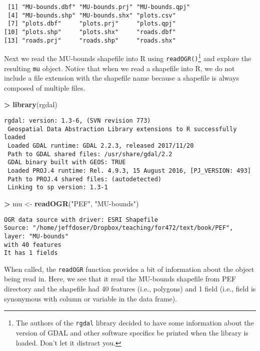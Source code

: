 \documentclass[]{krantz}
\makeatletter
\newenvironment{Shaded}{\begin{snugshade}}{\end{snugshade}}
\newcommand{\KeywordTok}[1]{\textcolor[rgb]{0.27,0.27,0.27}{\textbf{#1}}}
\newcommand{\StringTok}[1]{\textcolor[rgb]{0.5,0.5,0.5}{#1}}
\newcommand{\OperatorTok}[1]{\textcolor[rgb]{0.43,0.43,0.43}{\textbf{#1}}}
\newcommand{\NormalTok}[1]{#1}
\newenvironment{kframe}{%
\medskip{}
\setlength{\fboxsep}{.8em}
 \def\at@end@of@kframe{}%
 \ifinner\ifhmode%
  \def\at@end@of@kframe{\end{minipage}}%
  \begin{minipage}{\columnwidth}%
 \fi\fi%
 \def\FrameCommand##1{\hskip\@totalleftmargin \hskip-\fboxsep
 \colorbox{shadecolor}{##1}\hskip-\fboxsep
     \hskip-\linewidth \hskip-\@totalleftmargin \hskip\columnwidth}%
 \MakeFramed {\advance\hsize-\width
   \@totalleftmargin\z@ \linewidth\hsize
   \@setminipage}}%
 {\par\unskip\endMakeFramed%
 \at@end@of@kframe}
\renewenvironment{Shaded}{\begin{kframe}}{\end{kframe}}
\theoremstyle{definition}
\theoremstyle{definition}
\theoremstyle{definition}
\theoremstyle{remark}
\makeatother
\begin{document}
\begin{verbatim}
 [1] "MU-bounds.dbf" "MU-bounds.prj" "MU-bounds.qpj"
 [4] "MU-bounds.shp" "MU-bounds.shx" "plots.csv"    
 [7] "plots.dbf"     "plots.prj"     "plots.qpj"    
[10] "plots.shp"     "plots.shx"     "roads.dbf"    
[13] "roads.prj"     "roads.shp"     "roads.shx"    
\end{verbatim}

Next we read the MU-bounds shapefile into R using
\texttt{readOGR()}\footnote{The authors of the \texttt{rgdal} library
  decided to have some information about the version of GDAL and other
  software specifics be printed when the library is loaded. Don't let it
  distract you.} and explore the resulting \texttt{mu} object. Notice
that when we read a shapefile into R, we do not include a file extension
with the shapefile name because a shapefile is always composed of
multiple files.

\begin{Shaded}
\begin{Highlighting}[]
\OperatorTok{>}\StringTok{ }\KeywordTok{library}\NormalTok{(rgdal)}
\end{Highlighting}
\end{Shaded}

\begin{verbatim}
rgdal: version: 1.3-6, (SVN revision 773)
 Geospatial Data Abstraction Library extensions to R successfully loaded
 Loaded GDAL runtime: GDAL 2.2.3, released 2017/11/20
 Path to GDAL shared files: /usr/share/gdal/2.2
 GDAL binary built with GEOS: TRUE 
 Loaded PROJ.4 runtime: Rel. 4.9.3, 15 August 2016, [PJ_VERSION: 493]
 Path to PROJ.4 shared files: (autodetected)
 Linking to sp version: 1.3-1 
\end{verbatim}

\begin{Shaded}
\begin{Highlighting}[]
\OperatorTok{>}\StringTok{ }\NormalTok{mu <-}\StringTok{ }\KeywordTok{readOGR}\NormalTok{(}\StringTok{"PEF"}\NormalTok{, }\StringTok{"MU-bounds"}\NormalTok{)}
\end{Highlighting}
\end{Shaded}

\begin{verbatim}
OGR data source with driver: ESRI Shapefile 
Source: "/home/jeffdoser/Dropbox/teaching/for472/text/book/PEF", layer: "MU-bounds"
with 40 features
It has 1 fields
\end{verbatim}

When called, the \texttt{readOGR} function provides a bit of information
about the object being read in. Here, we see that it read the MU-bounds
shapefile from PEF directory and the shapefile had 40 features (i.e.,
polygons) and 1 field (i.e., field is synonymous with column or variable
in the data frame).
\end{document}
